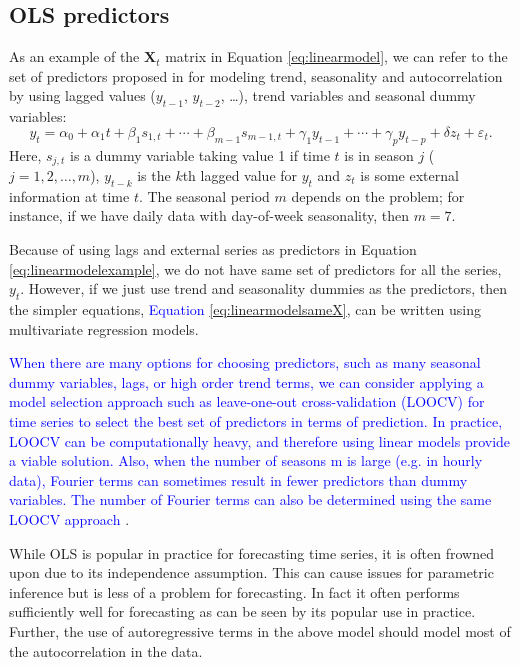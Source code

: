 \documentclass[11pt,a4paper,]{article}
\begin{document}
\hypertarget{ols-predictors}{%
\subsection{OLS predictors}\label{ols-predictors}}

As an example of the \(\bm{X}_t\) matrix in Equation \eqref{eq:linearmodel}, we can refer to the set of predictors proposed in \textcite{ashouri2018} for modeling trend, seasonality and autocorrelation by using lagged values (\(y_{t-1}\), \(y_{t-2}\), \dots), trend variables and seasonal dummy variables:
\begin{equation}\label{eq:linearmodelexample}
   y_t = \alpha_0 + \alpha_1 t + \beta_1 s_{1,t} + \cdots + \beta_{m-1} s_{m-1,t} + \gamma_1 y_{t-1} + \cdots + \gamma_p y_{t-p} + \delta z_t + \varepsilon_t.
\end{equation}
Here, \(s_{j,t}\) is a dummy variable taking value 1 if time \(t\) is in season \(j\) (\(j=1, 2, \dots, m\)), \(y_{t-k}\) is the \(k\)th lagged value for \(y_t\) and \(z_t\) is some external information at time \(t\). The seasonal period \(m\) depends on the problem; for instance, if we have daily data with day-of-week seasonality, then \(m=7\).

Because of using lags and external series as predictors in Equation \eqref{eq:linearmodelexample}, we do not have same set of predictors for all the series, \(y_t\). However, if we just use trend and seasonality dummies as the predictors, then the simpler equations, \textcolor{blue}{Equation} \eqref{eq:linearmodelsameX}, can be written using multivariate regression models.

\textcolor{blue}{When there are many options for choosing predictors, such as many seasonal dummy variables, lags, or high order trend terms, we can consider applying a model selection approach such as leave-one-out cross-validation (LOOCV) for time series to select the best set of predictors in terms of prediction. In practice, LOOCV can be computationally heavy, and therefore using linear models provide a viable solution. Also, when the number of seasons m is large (e.g. in hourly data), Fourier terms can sometimes result in  fewer predictors than dummy variables. The number of Fourier terms can also be determined using the same LOOCV approach} \autocite{fpp2}.

While OLS is popular in practice for forecasting time series, it is often frowned upon due to its independence assumption. This can cause issues for parametric inference but is less of a problem for forecasting. In fact it often performs sufficiently well for forecasting as can be seen by its popular use in practice. Further, the use of autoregressive terms in the above model should model most of the autocorrelation in the data.
\end{document}
